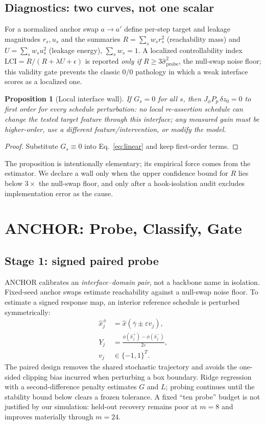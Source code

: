 \documentclass[letterpaper]{article}
\newtheorem{proposition}{Proposition}
\begin{document}
\subsection{Diagnostics: two curves, not one scalar}
For a normalized anchor swap $a\to a'$ define per-step target and leakage
magnitudes $r_s,u_s$ and the summaries
$R=\sum_s w_s r_s^2$ (reachability mass) and
$U=\sum_s w_s u_s^2$ (leakage energy), $\sum_s w_s{=}1$. A localized
controllability index
$\mathrm{LCI}=R/(R+\lambda U+\epsilon)$ is reported \emph{only if}
$R\ge 3\hat\sigma^2_{\mathrm{probe}}$, the null-swap noise floor;
this validity gate prevents the classic $0/0$ pathology in which a weak
interface scores as a localized one.

\begin{proposition}[Local interface wall]\label{prop:wall}
If $G_s=0$ for all $s$, then $J_\phi P_p\,\delta z_0=0$ to first order for
every schedule perturbation: no local re-assertion schedule can change the
tested target feature through this interface; any measured gain must be
higher-order, use a different feature/intervention, or modify the model.
\end{proposition}
\begin{proof}
Substitute $G_s\equiv 0$ into Eq.~\eqref{eq:linear} and keep first-order
terms.
\end{proof}
The proposition is intentionally elementary; its empirical force comes
from the estimator. We declare a wall only when the upper confidence bound
for $R$ lies below $3\times$ the null-swap floor, and only after a
hook-isolation audit excludes implementation error as the cause.

\section{ANCHOR: Probe, Classify, Gate}
\label{sec:method}
\subsection{Stage 1: signed paired probe}
ANCHOR calibrates an \emph{interface--domain pair}, not a backbone name in
isolation. Fixed-seed anchor swaps estimate reachability against a null-swap
noise floor. To estimate a signed response map, an interior reference
schedule is perturbed symmetrically:
\begin{equation}
\begin{aligned}
\hat x_j^\pm&=\hat x(\bar\gamma\pm\varepsilon v_j),\\
Y_j&=\frac{\phi(\hat x_j^+)-\phi(\hat x_j^-)}{2\varepsilon},\\
v_j&\in\{-1,1\}^T .
\end{aligned}
\label{eq:pairedprobe}
\end{equation}
The paired design removes the shared stochastic trajectory and avoids the
one-sided clipping bias incurred when perturbing a box boundary. Ridge
regression with a second-difference penalty estimates $G$ and $L$; probing
continues until the stability bound below clears a frozen tolerance. A fixed
``ten probe'' budget is not justified by our simulation: held-out recovery
remains poor at $m{=}8$ and improves materially through $m{=}24$.
\end{document}

